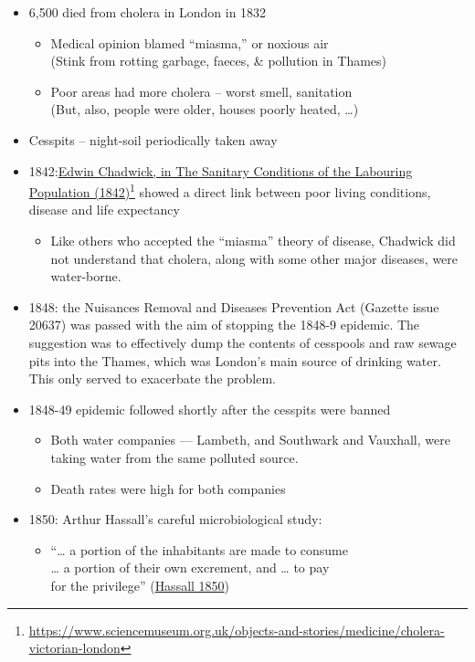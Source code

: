 \documentclass[
  10pt,
  b5paper]{book}
\providecommand{\tightlist}{%
  \setlength{\itemsep}{0pt}\setlength{\parskip}{0pt}}
\begin{document}
\begin{itemize}
\tightlist
\item
  6,500 died from cholera in London in 1832

  \begin{itemize}
  \tightlist
  \item
    Medical opinion blamed ``miasma,'' or noxious air\\
    (Stink from rotting garbage, faeces, \& pollution in Thames)
  \item
    Poor areas had more cholera -- worst smell, sanitation\\
    (But, also, people were older, houses poorly heated, \ldots)
  \end{itemize}
\item
  Cesspits -- night-soil periodically taken away
\item
  1842:\href{https://www.sciencemuseum.org.uk/objects-and-stories/medicine/cholera-victorian-london}{Edwin Chadwick, in The Sanitary Conditions of the Labouring Population (1842)}\footnote{\url{https://www.sciencemuseum.org.uk/objects-and-stories/medicine/cholera-victorian-london}}
  showed a direct link between poor living conditions, disease and life expectancy

  \begin{itemize}
  \tightlist
  \item
    Like others who accepted the ``miasma'' theory of disease, Chadwick did
    not understand that cholera, along with some other major diseases, were water-borne.
  \end{itemize}
\item
  1848: the Nuisances Removal and Diseases Prevention Act (Gazette issue 20637) was passed with the aim of stopping the 1848-9 epidemic. The suggestion was to
  effectively dump the contents of cesspools and raw
  sewage pits into the Thames, which was London's main source of drinking water. This only served to exacerbate the problem.
\item
  1848-49 epidemic followed shortly after the cesspits were banned

  \begin{itemize}
  \tightlist
  \item
    Both water companies --- Lambeth, and Southwark and Vauxhall,
    were taking water from the same polluted source.
  \item
    Death rates were high for both companies
  \end{itemize}
\item
  1850: Arthur Hassall's careful microbiological study:

  \begin{itemize}
  \tightlist
  \item
    ``\ldots{} a portion of the inhabitants are made to consume\\
    \ldots{} a portion of their own excrement, and \ldots{} to pay\\
    for the privilege'' (\protect\hyperlink{ref-hassall1850memoir}{Hassall 1850})
  \end{itemize}
\end{itemize}
\end{document}
